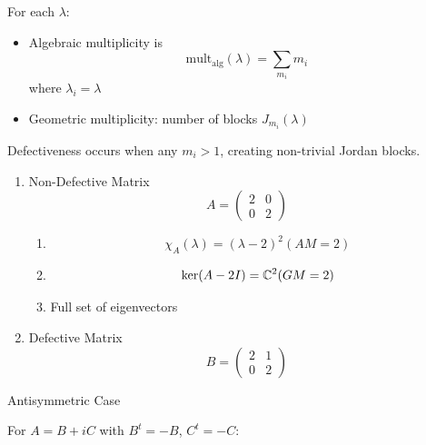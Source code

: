 For each $\lambda$:

\begin{itemize}
\item Algebraic multiplicity is 
\begin{equation}
\text{mult}_{\text{alg}}(\lambda )=\sum_{m_{i}}m_{i}
\end{equation}%
where $\lambda _{i}=\lambda $

\item Geometric multiplicity: number of blocks $J_{m_{i}}(\lambda )$
\end{itemize}

Defectiveness occurs when any $m_{i}>1$, creating non-trivial Jordan blocks.

\begin{enumerate}
\item Non-Defective Matrix%
\begin{equation}
A=\left( 
\begin{array}{cc}
2 & 0 \\ 
0 & 2%
\end{array}%
\right)
\end{equation}

\begin{enumerate}
\item 
\begin{equation}
\chi _{A}(\lambda )=(\lambda -2)^{2}(AM=2)
\end{equation}

\item 
\begin{equation}
\ker (A-2I)={\Bbb C}^{2}(GM=2)
\end{equation}

\item Full set of eigenvectors
\end{enumerate}

\item Defective Matrix%
\begin{equation}
B=\left( 
\begin{array}{cc}
2 & 1 \\ 
0 & 2%
\end{array}%
\right)
\end{equation}
\end{enumerate}

\begin{example}
Antisymmetric Case
\end{example}

For $A=B+iC$ with $B^{t}=-B$, $C^{t}=-C$:

